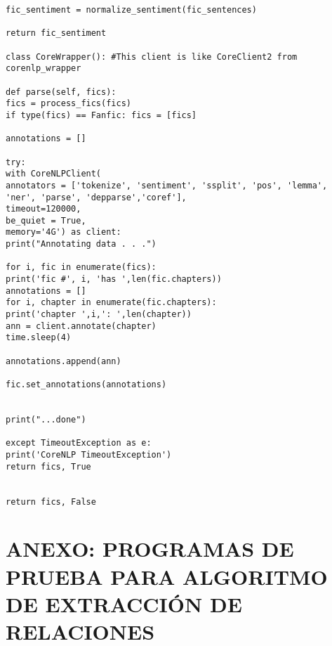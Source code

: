 \documentclass{pre-tfg}
\begin{document}
\begin{lstlisting}[style=consola]
fic_sentiment = normalize_sentiment(fic_sentences)

return fic_sentiment

class CoreWrapper(): #This client is like CoreClient2 from corenlp_wrapper

def parse(self, fics):
fics = process_fics(fics)
if type(fics) == Fanfic: fics = [fics]

annotations = []

try:
with CoreNLPClient(
annotators = ['tokenize', 'sentiment', 'ssplit', 'pos', 'lemma', 'ner', 'parse', 'depparse','coref'],
timeout=120000,
be_quiet = True,
memory='4G') as client:
print("Annotating data . . .")

for i, fic in enumerate(fics):
print('fic #', i, 'has ',len(fic.chapters))
annotations = []
for i, chapter in enumerate(fic.chapters):
print('chapter ',i,': ',len(chapter))
ann = client.annotate(chapter)
time.sleep(4)

annotations.append(ann)

fic.set_annotations(annotations)


print("...done")

except TimeoutException as e:
print('CoreNLP TimeoutException')
return fics, True


return fics, False

\end{lstlisting}

\cleardoublepage
\section{ANEXO: PROGRAMAS DE PRUEBA PARA ALGORITMO DE EXTRACCIÓN DE RELACIONES}
\end{document}
